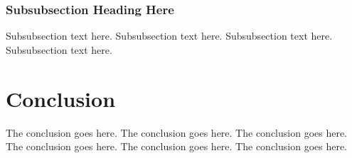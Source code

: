 \documentclass[journal]{IEEEtran}
\begin{document}

\subsubsection{Subsubsection Heading Here}
Subsubsection text here.
Subsubsection text here.
Subsubsection text here.
Subsubsection text here.

\section{Conclusion}
The conclusion goes here.
The conclusion goes here.
The conclusion goes here.
The conclusion goes here.
The conclusion goes here.
The conclusion goes here.


\end{document}
